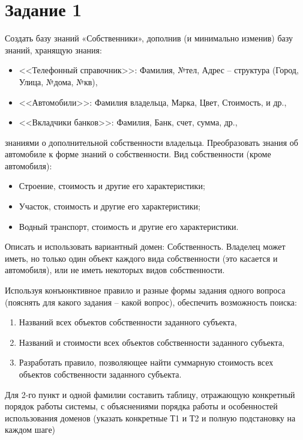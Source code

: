 \documentclass[12pt]{report}
\begin{document}
	\section*{Задание 1}
	Создать базу знаний «Собственники», дополнив (и минимально изменив) базу
	знаний, хранящую знания:
	\begin{itemize}
	\item <<Телефонный справочник>>: Фамилия, №тел, Адрес – структура (Город, 
	Улица, №дома, №кв),
	\item <<Автомобили>>: Фамилия владельца, Марка, Цвет, Стоимость, и др.,
	\item <<Вкладчики банков>>: Фамилия, Банк, счет, сумма, др.,
	\end{itemize}
	знаниями о дополнительной собственности владельца. Преобразовать знания об 
	автомобиле к форме знаний о собственности.
	Вид собственности (кроме автомобиля):
	\begin{itemize}
	\item Строение, стоимость и другие его характеристики;
	\item Участок, стоимость и другие его характеристики;
	\item Водный транспорт, стоимость и другие его характеристики.
	\end{itemize}

	Описать и использовать вариантный домен: Собственность. Владелец может иметь, но 
	только один объект каждого вида собственности (это касается и автомобиля), или не 
	иметь некоторых видов собственности. 
	
	Используя конъюнктивное правило и разные формы задания одного вопроса (пояснять 
	для какого задания – какой вопрос), 
	обеспечить возможность поиска:
	\begin{enumerate}
		\item Названий всех объектов собственности заданного субъекта,
		\item Названий и стоимости всех объектов собственности заданного субъекта,
		\item Разработать правило, позволяющее найти суммарную стоимость всех 
		объектов собственности заданного субъекта.
	\end{enumerate}

	Для 2-го пункт и одной фамилии составить таблицу, отражающую конкретный 
	порядок работы системы, с объяснениями порядка работы и особенностей использования 
	доменов (указать конкретные Т1 и Т2 и полную подстановку на каждом шаге)
	
	
\end{document}
